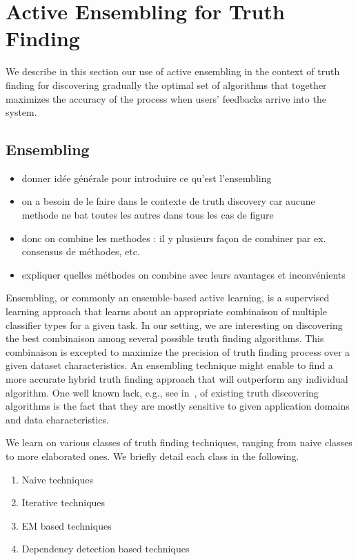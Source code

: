 \section{Active Ensembling for Truth Finding}
We describe in this section our use of active ensembling in the context of truth finding
for discovering gradually the optimal set of algorithms that together maximizes the accuracy
of the process when users' feedbacks arrive into the system.

\subsection{Ensembling }
\begin{itemize}
\item donner idée générale pour introduire  ce qu'est l'ensembling
\item on a besoin de le faire dans le contexte de truth discovery car aucune methode ne bat toutes les autres dans tous les cas de figure
\item donc on combine les methodes : il y plusieurs façon de combiner par ex. consensus de méthodes, etc.
\item expliquer quelles méthodes on combine avec leurs avantages et inconvénients
\end{itemize}


Ensembling, or commonly an ensemble-based active learning, is a supervised learning approach that learns
about an appropriate combinaison of multiple classifier types for a given task. In our setting, we are interesting
on discovering the best combinaison among several possible truth finding algorithms. This combinaison is excepted 
to maximize the precision of truth finding process over a given dataset characteristics. An ensembling technique 
might enable to find a more accurate hybrid truth finding approach that will outperform any individual algorithm.
One well known lack, e.g., see in~\cite{Li12, Wagui14}, of existing truth discovering algorithms is the fact that
they are mostly sensitive to given application domains and data characteristics.



We learn on various classes of truth finding techniques, ranging from naive classes to more elaborated ones. We
briefly detail each class in the following.
\begin{enumerate}
 \item Naive techniques
 \item Iterative techniques
 \item EM based techniques
 \item Dependency detection based techniques
\end{enumerate}



